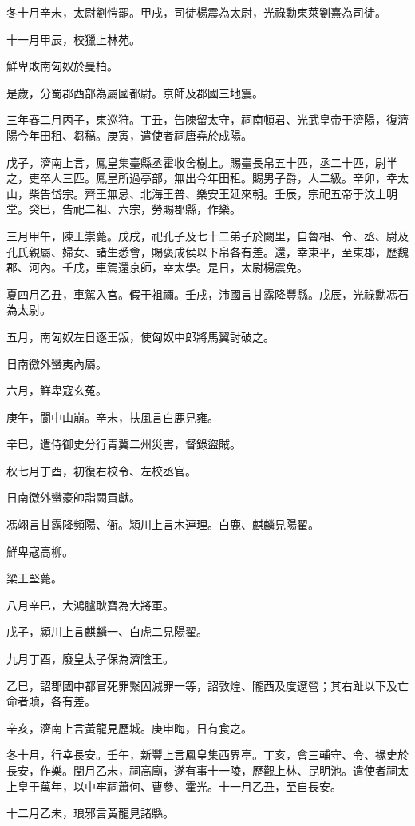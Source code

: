 \begin{pinyinscope}
冬十月辛未，太尉劉愷罷。甲戌，司徒楊震為太尉，光祿勳東萊劉熹為司徒。

十一月甲辰，校獵上林苑。

鮮卑敗南匈奴於曼柏。

是歲，分蜀郡西部為屬國都尉。京師及郡國三地震。

三年春二月丙子，東巡狩。丁丑，告陳留太守，祠南頓君、光武皇帝于濟陽，復濟陽今年田租、芻稿。庚寅，遣使者祠唐堯於成陽。

戊子，濟南上言，鳳皇集臺縣丞霍收舍樹上。賜臺長帛五十匹，丞二十匹，尉半之，吏卒人三匹。鳳皇所過亭部，無出今年田租。賜男子爵，人二級。辛卯，幸太山，柴告岱宗。齊王無忌、北海王普、樂安王延來朝。壬辰，宗祀五帝于汶上明堂。癸巳，告祀二祖、六宗，勞賜郡縣，作樂。

三月甲午，陳王崇薨。戊戌，祀孔子及七十二弟子於闕里，自魯相、令、丞、尉及孔氏親屬、婦女、諸生悉會，賜褒成侯以下帛各有差。還，幸東平，至東郡，歷魏郡、河內。壬戌，車駕還京師，幸太學。是日，太尉楊震免。

夏四月乙丑，車駕入宮。假于祖禰。壬戌，沛國言甘露降豐縣。戊辰，光祿勳馮石為太尉。

五月，南匈奴左日逐王叛，使匈奴中郎將馬翼討破之。

日南徼外蠻夷內屬。

六月，鮮卑寇玄菟。

庚午，閬中山崩。辛未，扶風言白鹿見雍。

辛巳，遣侍御史分行青冀二州災害，督錄盜賊。

秋七月丁酉，初復右校令、左校丞官。

日南徼外蠻豪帥詣闕貢獻。

馮翊言甘露降頻陽、衙。潁川上言木連理。白鹿、麒麟見陽翟。

鮮卑寇高柳。

梁王堅薨。

八月辛巳，大鴻臚耿寶為大將軍。

戊子，潁川上言麒麟一、白虎二見陽翟。

九月丁酉，廢皇太子保為濟陰王。

乙巳，詔郡國中都官死罪繫囚減罪一等，詔敦煌、隴西及度遼營；其右趾以下及亡命者贖，各有差。

辛亥，濟南上言黃龍見歷城。庚申晦，日有食之。

冬十月，行幸長安。壬午，新豐上言鳳皇集西界亭。丁亥，會三輔守、令、掾史於長安，作樂。閏月乙未，祠高廟，遂有事十一陵，歷觀上林、昆明池。遣使者祠太上皇于萬年，以中牢祠蕭何、曹參、霍光。十一月乙丑，至自長安。

十二月乙未，琅邪言黃龍見諸縣。


\end{pinyinscope}
